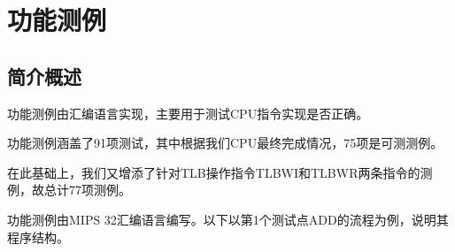 \chapter{功能测例}

\section{简介概述}

功能测例由汇编语言实现，主要用于测试CPU指令实现是否正确。

功能测例涵盖了91项测试，其中根据我们CPU最终完成情况，75项是可测测例。

在此基础上，我们又增添了针对TLB操作指令TLBWI和TLBWR两条指令的测例，故总计77项测例。


功能测例由MIPS 32汇编语言编写。以下以第1个测试点ADD的流程为例，说明其程序结构。


